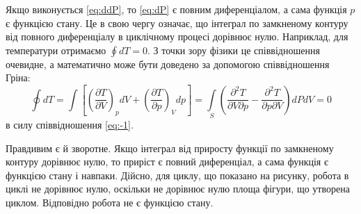 Якщо виконується \eqref{eq:ddP}, то \eqref{eq:dP} є повним диференціалом, а сама функція $p$ є функцією стану. Це в свою чергу означає, що інтеграл по замкненому контуру від повного диференціалу в циклічному процесі дорівнює нулю. Наприклад, для температури отримаємо $\oint dT = 0$. З точки зору фізики це співвідношення очевидне, а математично може бути доведено за допомогою співвідношення Гріна:
\begin{equation*}
    \oint dT = \int \left[  \left(\frac{\partial T}{\partial V}\right)_p dV +  \left(\frac{\partial T}{\partial p}\right)_V dp \right] = \int\limits_S \left(\frac{\partial^2 T}{\partial V \partial p} - \frac{\partial^2 T}{\partial p \partial V}\right) dPdV = 0
\end{equation*}
в силу співвідношення \eqref{eq:-1}.

Правдивим є й зворотне. Якщо інтеграл від приросту функції по замкненому контуру дорівнює нулю, то приріст є повний диференціал, а сама функція є функцією стану і навпаки. Дійсно, для циклу, що показано на рисунку, робота в циклі не дорівнює нулю, оскільки не дорівнює нулю площа фігури, що утворена циклом. Відповідно робота не є функцією стану.